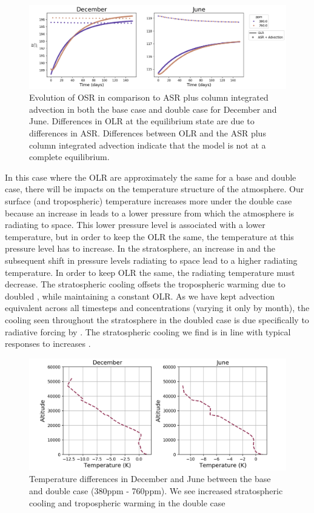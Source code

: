 \documentclass[12]{article}
\begin{document}
\begin{figure}[htbp!]
\noindent\includegraphics[width=1\textwidth]{figures/ASR_OLR.png}
\centering
\caption{Evolution of OSR in comparison to ASR plus column integrated advection in both the base case and double  case for December and June. Differences in OLR at the equilibrium state are due to differences in ASR. Differences between OLR and the ASR plus column integrated advection indicate that the model is not at a complete equilibrium.}
\label{fig:ASR_OLR}
\end{figure}

In this case where the OLR are approximately the same for a base and double  case, there will be impacts on the temperature structure of the atmosphere. Our surface (and tropospheric) temperature increases more under the double  case because an increase in  leads to a lower pressure from which the atmosphere is radiating to space. This lower pressure level is associated with a lower temperature, but in order to keep the OLR the same, the temperature at this pressure level has to increase. In the stratosphere, an increase in  and the subsequent shift in pressure levels radiating to space lead to a higher radiating temperature. In order to keep OLR the same, the radiating temperature must decrease. The stratospheric cooling offsets the tropospheric warming due to doubled , while maintaining a constant OLR. As we have kept advection equivalent across all timesteps and  concentrations (varying it only by month), the cooling seen throughout the stratosphere in the doubled  case is due specifically to radiative forcing by . The stratospheric cooling we find is in line with typical responses to  increases \citep{rind_climate_1989, fels_stratospheric_1980}. 

\begin{figure}[htbp!]
\noindent\includegraphics[width=.8\textwidth]{temp_evolution.png}
\centering
\caption{Temperature differences in December and June between the base and double  case (380ppm - 760ppm). We see increased stratospheric cooling and tropospheric warming in the double  case}
\label{fig:temp_step}
\end{figure}
\end{document}
